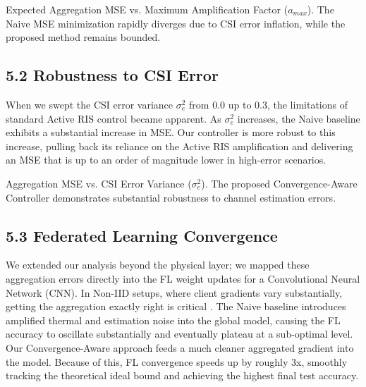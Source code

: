 \documentclass[10pt,twocolumn]{article}
\begin{document}
Expected Aggregation MSE vs. Maximum Amplification Factor ($a_{max}$). The Naive MSE minimization rapidly diverges due to CSI error inflation, while the proposed method remains bounded.
\subsection{5.2	Robustness to CSI Error}

When we swept the CSI error variance $\sigma _{e}^{2}$ from 0.0 up to 0.3, the limitations of standard Active RIS control became apparent. As $\sigma _{e}^{2}$ increases, the Naive baseline exhibits a substantial increase in MSE. Our controller is more robust to this increase, pulling back its reliance on the Active RIS amplification and delivering an MSE that is up to an order of magnitude lower in high-error scenarios.
\begin{table}[h!]
\centering
{}\label{tab:eaf74a02-5eb9-4e67-826b-f4e0cf829028}
\end{table}

Aggregation MSE vs. CSI Error Variance ($\sigma _{e}^{2}$). The proposed Convergence-Aware Controller demonstrates substantial robustness to channel estimation errors.
\subsection{5.3	Federated Learning Convergence}

We extended our analysis beyond the physical layer; we mapped these aggregation errors directly into the FL weight updates for a Convolutional Neural Network (CNN). In Non-IID setups, where client gradients vary substantially, getting the aggregation exactly right is critical  \parencite{hongda_wu_8aa94c1b}. The Naive baseline introduces amplified thermal and estimation noise into the global model, causing the FL accuracy to oscillate substantially and eventually plateau at a sub-optimal level. Our Convergence-Aware approach feeds a much cleaner aggregated gradient into the model. Because of this, FL convergence speeds up by roughly 3x, smoothly tracking the theoretical ideal bound and achieving the highest final test accuracy.
\begin{table}[h!]
\centering
{}\label{tab:df479f49-83c8-46b3-96c8-a8f54eea802f}
\end{table}
\end{document}
